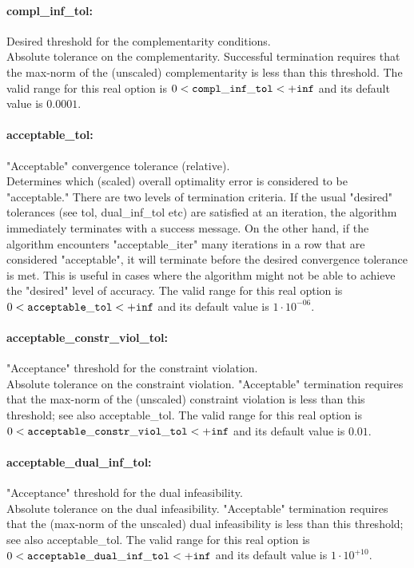 \paragraph{compl\_inf\_tol:}\label{sec:compl_inf_tol} Desired threshold for the complementarity conditions. $\;$ \\
 Absolute tolerance on the complementarity.
Successful termination requires that the max-norm
of the (unscaled) complementarity is less than
this threshold. The valid range for this real option is 
$0 <  {\tt compl\_inf\_tol } <  {\tt +inf}$
and its default value is $0.0001$.


\paragraph{acceptable\_tol:}\label{sec:acceptable_tol} "Acceptable" convergence tolerance (relative). $\;$ \\
 Determines which (scaled) overall optimality
error is considered to be "acceptable." There are
two levels of termination criteria.  If the usual
"desired" tolerances (see tol, dual\_inf\_tol
etc) are satisfied at an iteration, the algorithm
immediately terminates with a success message. 
On the other hand, if the algorithm encounters
"acceptable\_iter" many iterations in a row that
are considered "acceptable", it will terminate
before the desired convergence tolerance is met.
This is useful in cases where the algorithm might
not be able to achieve the "desired" level of
accuracy. The valid range for this real option is 
$0 <  {\tt acceptable\_tol } <  {\tt +inf}$
and its default value is $1 \cdot 10^{-06}$.


\paragraph{acceptable\_constr\_viol\_tol:}\label{sec:acceptable_constr_viol_tol} "Acceptance" threshold for the constraint violation. $\;$ \\
 Absolute tolerance on the constraint violation.
"Acceptable" termination requires that the
max-norm of the (unscaled) constraint violation
is less than this threshold; see also
acceptable\_tol. The valid range for this real option is 
$0 <  {\tt acceptable\_constr\_viol\_tol } <  {\tt +inf}$
and its default value is $0.01$.


\paragraph{acceptable\_dual\_inf\_tol:}\label{sec:acceptable_dual_inf_tol} "Acceptance" threshold for the dual infeasibility. $\;$ \\
 Absolute tolerance on the dual infeasibility.
"Acceptable" termination requires that the
(max-norm of the unscaled) dual infeasibility is
less than this threshold; see also
acceptable\_tol. The valid range for this real option is 
$0 <  {\tt acceptable\_dual\_inf\_tol } <  {\tt +inf}$
and its default value is $1 \cdot 10^{+10}$.


